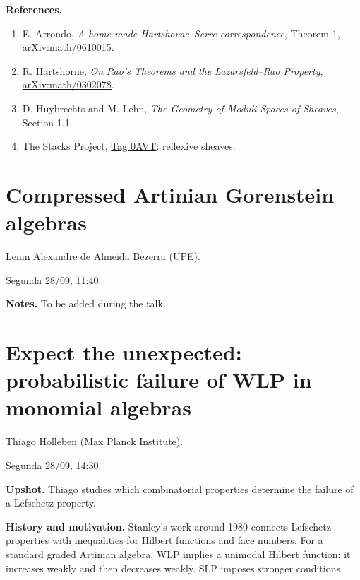 \medskip\noindent
\textbf{References.}
\begin{enumerate}
\raggedright
\item\label{item-jardim-serre}
E. Arrondo,
\emph{A home-made Hartshorne--Serre
correspondence}, Theorem 1,
\href{https://arxiv.org/abs/math/0610015}
{arXiv:math/0610015}.
\item\label{item-jardim-rao}
R. Hartshorne,
\emph{On Rao's Theorems and the
Lazarsfeld--Rao Property},
\href{https://arxiv.org/abs/math/0302078}
{arXiv:math/0302078}.
\item\label{item-jardim-hl}
D. Huybrechts and M. Lehn,
\emph{The Geometry of Moduli Spaces
of Sheaves}, Section 1.1.
\item\label{item-jardim-stacks}
The Stacks Project,
\href{%
https://stacks.math.columbia.edu/tag/0AVT%
}
{Tag 0AVT}: reflexive sheaves.
\end{enumerate}

\section{Compressed Artinian Gorenstein
algebras}
\label{section-lenin-bezerra}

Lenin Alexandre de Almeida Bezerra (UPE).

Segunda 28/09, 11:40.

\medskip\noindent
\textbf{Notes.}
To be added during the talk.

\section{Expect the unexpected: probabilistic
failure of WLP in monomial algebras}
\label{section-thiago-holleben}

Thiago Holleben (Max Planck Institute).

Segunda 28/09, 14:30.

\medskip\noindent
\textbf{Upshot.}
Thiago studies which combinatorial
properties determine the failure of a
Lefschetz property.

\medskip\noindent
\textbf{History and motivation.}
Stanley's work around 1980 connects
Lefschetz properties with inequalities
for Hilbert functions and face numbers.
For a standard graded Artinian algebra,
WLP implies a unimodal Hilbert function:
it increases weakly and then decreases
weakly. SLP imposes stronger conditions.


